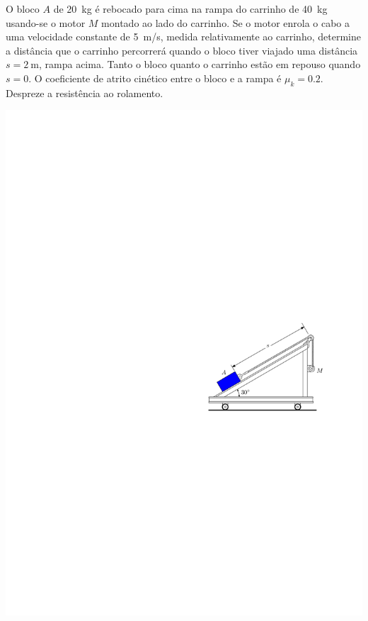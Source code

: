 \item O bloco $A$ de \SI{20}{\kilogram} é rebocado para cima na rampa do carrinho de \SI{40}{\kilogram} usando-se o motor $M$ montado ao lado do carrinho. Se o motor enrola o cabo a uma velocidade constante de \SI{5}{\meter/\second}, medida
relativamente ao carrinho, determine a distância que o carrinho percorrerá quando o bloco tiver viajado uma distância $s=\SI{2}{\meter}$, rampa acima. Tanto o bloco quanto o carrinho estão em repouso quando $s=0$. O coeficiente de atrito
cinético entre o bloco e a rampa é $\mu_{k}=0.2$. Despreze a resistência
ao rolamento.


\vspace{-.7cm}
\begin{flushright}
	\includegraphics[scale=1.3]{images/draw_4}
\end{flushright}